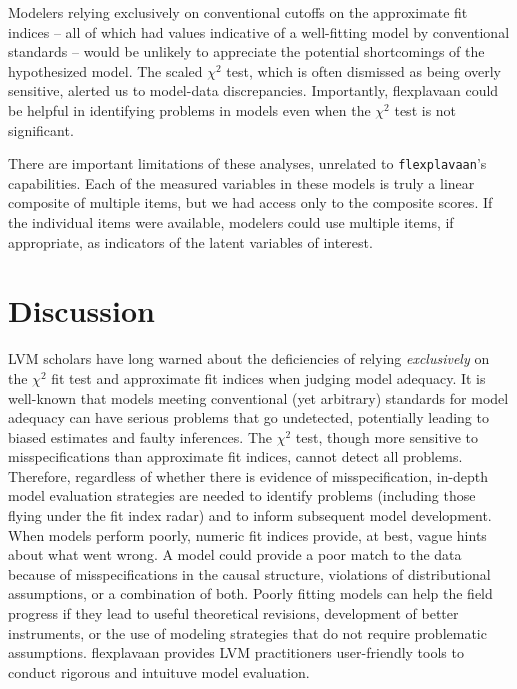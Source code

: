 \documentclass[
  english,
  doc]{apa6}
\begin{document}
Modelers relying exclusively on conventional cutoffs on the approximate fit indices -- all of which had values indicative of a well-fitting model by conventional standards -- would be unlikely to appreciate the potential shortcomings of the hypothesized model. The scaled \(\chi^2\) test, which is often dismissed as being overly sensitive, alerted us to model-data discrepancies. Importantly, flexplavaan could be helpful in identifying problems in models even when the \(\chi^2\) test is not significant.

There are important limitations of these analyses, unrelated to \texttt{flexplavaan}'s capabilities. Each of the measured variables in these models is truly a linear composite of multiple items, but we had access only to the composite scores. If the individual items were available, modelers could use multiple items, if appropriate, as indicators of the latent variables of interest.

\hypertarget{discussion}{%
\section{Discussion}\label{discussion}}

LVM scholars have long warned about the deficiencies of relying \emph{exclusively} on the \(\chi^2\) fit test and approximate fit indices when judging model adequacy. It is well-known that models meeting conventional (yet arbitrary) standards for model adequacy can have serious problems that go undetected, potentially leading to biased estimates and faulty inferences. The \(\chi^2\) test, though more sensitive to misspecifications than approximate fit indices, cannot detect all problems. Therefore, regardless of whether there is evidence of misspecification, in-depth model evaluation strategies are needed to identify problems (including those flying under the fit index radar) and to inform subsequent model development. When models perform poorly, numeric fit indices provide, at best, vague hints about what went wrong. A model could provide a poor match to the data because of misspecifications in the causal structure, violations of distributional assumptions, or a combination of both. Poorly fitting models can help the field progress if they lead to useful theoretical revisions, development of better instruments, or the use of modeling strategies that do not require problematic assumptions. flexplavaan provides LVM practitioners user-friendly tools to conduct rigorous and intuituve model evaluation.
\end{document}
